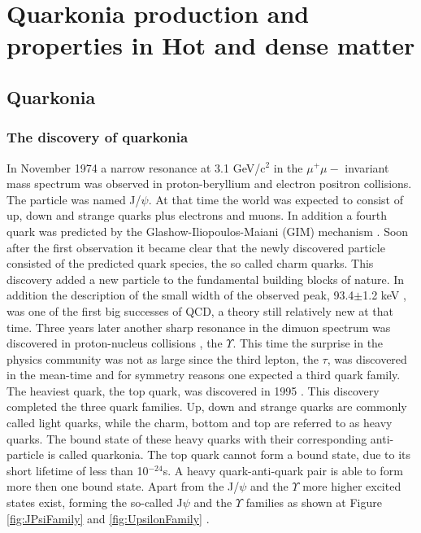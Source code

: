 \chapter{Quarkonia production and properties in Hot and dense matter}
\label{QuarkoniaInQGP}

\section{Quarkonia}

\subsection{The discovery of quarkonia}
In November 1974 a narrow resonance at 3.1 GeV/c$^2$ in the $\mu^+\mu-$ invariant
mass spectrum was observed \cite{JPsiDiscovery,DDbarMixing} in proton-beryllium and 
electron positron collisions. The particle was named J/$\psi$. At that time the world was
expected to consist of up, down and strange quarks plus electrons and muons.
In addition a fourth quark was predicted by the Glashow-Iliopoulos-Maiani
(GIM) mechanism \cite{GIM_CharmPred}. Soon after the first observation it became clear that
the newly discovered particle consisted of the predicted quark species, the so
called charm quarks. This discovery added a new particle to the fundamental
building blocks of nature. In addition the description of the small width of the
observed peak, 93.4$\pm$1.2 keV \cite{Rev_PartPhysics}, was one of the first big successes of QCD, a
theory still relatively new at that time. Three years later another sharp resonance
in the dimuon spectrum was discovered in proton-nucleus collisions \cite{YDiscovery},
the $\Upsilon$. This time the surprise in the physics community was not as large since
the third lepton, the $\tau$, was discovered in the mean-time and for symmetry
reasons one expected a third quark family. The heaviest quark, the top quark,
was discovered in 1995 \cite{TopDiscovery}. This discovery completed the three quark families.
Up, down and strange quarks are commonly called light quarks, while the
charm, bottom and top are referred to as heavy quarks. The bound state of
these heavy quarks with their corresponding anti-particle is called quarkonia.
The top quark cannot form a bound state, due to its short lifetime of less than
10$^{-24}$s. A heavy quark-anti-quark pair is able to form more then one bound
state. Apart from the J/$\psi$  and the $\Upsilon$ more higher excited states exist, forming
the so-called J$\psi$  and the $\Upsilon$ families as shown at Figure 
\ref{fig:JPsiFamily} and \ref{fig:UpsilonFamily} \cite{Rev_PartPhysics}.

